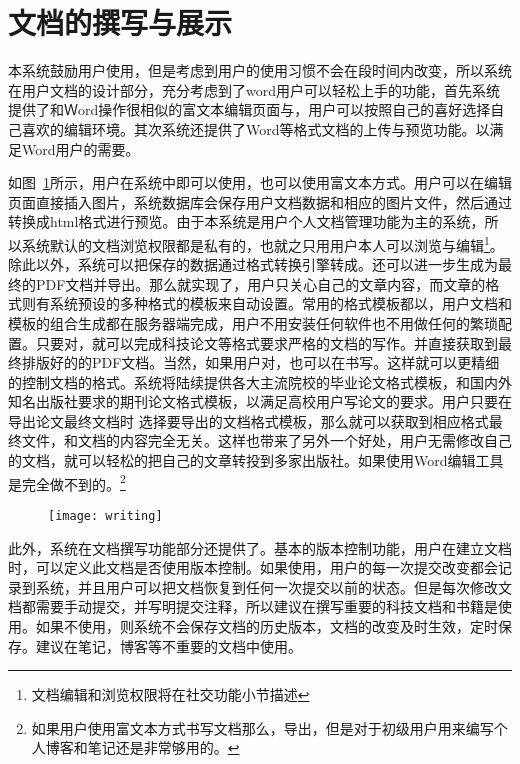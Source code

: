 \section{文档的撰写与展示}
\label{sec:writeandview}

本系统鼓励用户使用，但是考虑到用户的使用习惯不会在段时间内改变，所以系统在用户文档的设计部分，充分考虑到了word用户可以轻松上手的功能，首先系统提供了和Ｗord操作很相似的富文本编辑页面与，用户可以按照自己的喜好选择自己喜欢的编辑环境。其次系统还提供了Word等格式文档的上传与预览功能。以满足Word用户的需要。

如图~\ref{fig:xfig10}所示，用户在系统中即可以使用，也可以使用富文本方式。用户可以在编辑页面直接插入图片，系统数据库会保存用户文档数据和相应的图片文件，然后通过转换成html格式进行预览。由于本系统是用户个人文档管理功能为主的系统，所以系统默认的文档浏览权限都是私有的，也就之只用用户本人可以浏览与编辑\footnote{文档编辑和浏览权限将在社交功能小节描述}。除此以外，系统可以把保存的数据通过格式转换引擎转成。还可以进一步生成为最终的PDF文档并导出。那么就实现了，用户只关心自己的文章内容，而文章的格式则有系统预设的多种格式的模板来自动设置。常用的格式模板都以，用户文档和模板的组合生成都在服务器端完成，用户不用安装任何软件也不用做任何的繁琐配置。只要对，就可以完成科技论文等格式要求严格的文档的写作。并直接获取到最终排版好的的PDF文档。当然，如果用户对，也可以在书写。这样就可以更精细的控制文档的格式。系统将陆续提供各大主流院校的毕业论文格式模板，和国内外知名出版社要求的期刊论文格式模板，以满足高校用户写论文的要求。用户只要在导出论文最终文档时 选择要导出的文档格式模板，那么就可以获取到相应格式最终文件，和文档的内容完全无关。这样也带来了另外一个好处，用户无需修改自己的文档，就可以轻松的把自己的文章转投到多家出版社。如果使用Word编辑工具是完全做不到的。\footnote{如果用户使用富文本方式书写文档那么，导出，但是对于初级用户用来编写个人博客和笔记还是非常够用的。}
\begin{figure}[H]
  \centering
  \texttt{[image: writing]}
  \caption{}
  \label{fig:xfig10}
\end{figure}

此外，系统在文档撰写功能部分还提供了。基本的版本控制功能，用户在建立文档时，可以定义此文档是否使用版本控制。如果使用，用户的每一次提交改变都会记录到系统，并且用户可以把文档恢复到任何一次提交以前的状态。但是每次修改文档都需要手动提交，并写明提交注释，所以建议在撰写重要的科技文档和书籍是使用。如果不使用，则系统不会保存文档的历史版本，文档的改变及时生效，定时保存。建议在笔记，博客等不重要的文档中使用。

